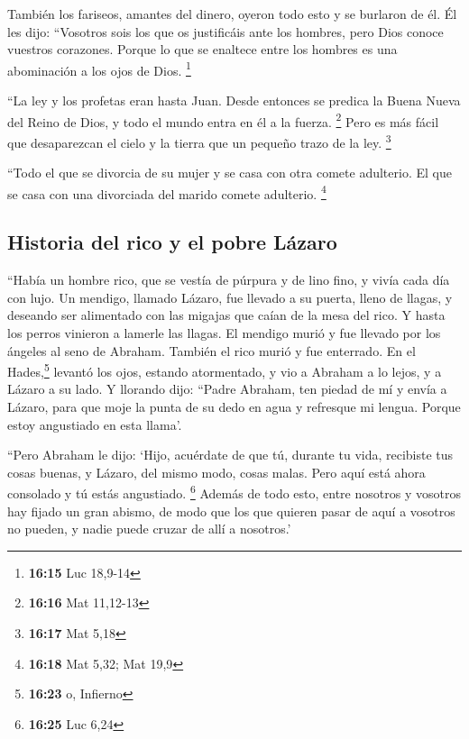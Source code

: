  También los fariseos, amantes del dinero, oyeron todo
esto y se burlaron de él.  Él les dijo: ``Vosotros sois
los que os justificáis ante los hombres, pero Dios conoce vuestros
corazones. Porque lo que se enaltece entre los hombres es una
abominación a los ojos de Dios. \footnote{\textbf{16:15} Luc 18,9-14}

 ``La ley y los profetas eran hasta Juan. Desde entonces
se predica la Buena Nueva del Reino de Dios, y todo el mundo entra en él
a la fuerza. \footnote{\textbf{16:16} Mat 11,12-13}  Pero
es más fácil que desaparezcan el cielo y la tierra que un pequeño trazo
de la ley. \footnote{\textbf{16:17} Mat 5,18}

 ``Todo el que se divorcia de su mujer y se casa con otra
comete adulterio. El que se casa con una divorciada del marido comete
adulterio. \footnote{\textbf{16:18} Mat 5,32; Mat 19,9}

\hypertarget{historia-del-rico-y-el-pobre-luxe1zaro}{%
\subsection{Historia del rico y el pobre
Lázaro}\label{historia-del-rico-y-el-pobre-luxe1zaro}}

 ``Había un hombre rico, que se vestía de púrpura y de
lino fino, y vivía cada día con lujo.  Un mendigo,
llamado Lázaro, fue llevado a su puerta, lleno de llagas,
 y deseando ser alimentado con las migajas que caían de
la mesa del rico. Y hasta los perros vinieron a lamerle las llagas.
 El mendigo murió y fue llevado por los ángeles al seno
de Abraham. También el rico murió y fue enterrado.  En el
Hades,\footnote{\textbf{16:23} o, Infierno} levantó los ojos, estando
atormentado, y vio a Abraham a lo lejos, y a Lázaro a su lado.
 Y llorando dijo: ``Padre Abraham, ten piedad de mí y
envía a Lázaro, para que moje la punta de su dedo en agua y refresque mi
lengua. Porque estoy angustiado en esta llama'.

 ``Pero Abraham le dijo: `Hijo, acuérdate de que tú,
durante tu vida, recibiste tus cosas buenas, y Lázaro, del mismo modo,
cosas malas. Pero aquí está ahora consolado y tú estás angustiado.
\footnote{\textbf{16:25} Luc 6,24}  Además de todo esto,
entre nosotros y vosotros hay fijado un gran abismo, de modo que los que
quieren pasar de aquí a vosotros no pueden, y nadie puede cruzar de allí
a nosotros.'

